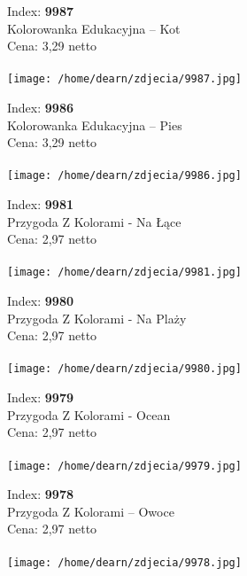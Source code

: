 {Index: \textbf{9987}\\
Kolorowanka Edukacyjna – Kot \\
Cena: 3,29 netto   \\\\  \texttt{[image: /home/dearn/zdjecia/9987.jpg]}}\newline\newline

{Index: \textbf{9986}\\
Kolorowanka Edukacyjna – Pies \\
Cena: 3,29 netto   \\\\  \texttt{[image: /home/dearn/zdjecia/9986.jpg]}}\newline\newline

{Index: \textbf{9981}\\
Przygoda Z Kolorami - Na Łące \\
Cena: 2,97 netto   \\\\  \texttt{[image: /home/dearn/zdjecia/9981.jpg]}}\newline\newline

{Index: \textbf{9980}\\
Przygoda Z Kolorami - Na Plaży \\
Cena: 2,97 netto   \\\\  \texttt{[image: /home/dearn/zdjecia/9980.jpg]}}\newline\newline

{Index: \textbf{9979}\\
Przygoda Z Kolorami - Ocean \\
Cena: 2,97 netto   \\\\  \texttt{[image: /home/dearn/zdjecia/9979.jpg]}}\newline\newline

{Index: \textbf{9978}\\
Przygoda Z Kolorami – Owoce\\
Cena: 2,97 netto   \\\\  \texttt{[image: /home/dearn/zdjecia/9978.jpg]}}\newline\newline

